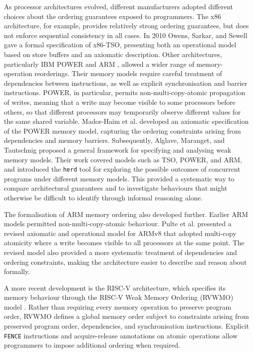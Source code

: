 As processor architectures evolved, different manufacturers adopted different choices about the ordering guarantees exposed to programmers. The x86 architecture, for example, provides relatively strong ordering guarantees, but does not enforce sequential consistency in all cases.  In 2010 Owens, Sarkar, and Sewell \cite{Sewell:2010} gave a formal specification of x86-TSO, presenting both an operational model based on store buffers and an axiomatic description. Other architectures, particularly IBM POWER \cite{powerpc1993} and ARM \cite{furberwilson1987} \cite{alglave2009semantics}, allowed a wider range of memory-operation reorderings. Their memory models require careful treatment of dependencies between instructions, as well as explicit synchronisation and barrier instructions. POWER, in particular, permits non-multi-copy-atomic propagation of writes, meaning that a write may become visible to some processors before others, so that different processors may temporarily observe different values for the same shared variable. Mador-Haim et al. \cite{mador-haim2012} developed an axiomatic specification of the POWER memory model, capturing the ordering constraints arising from dependencies and memory barriers. Subsequently, Alglave, Maranget, and Tautschnig \cite{alglave2014herding} proposed a general framework for specifying and analysing weak memory models. Their work covered models such as TSO, POWER, and ARM, and introduced the \texttt{herd} tool for exploring the possible outcomes of concurrent programs under different memory models. This provided a systematic way to compare architectural guarantees and to investigate behaviours that might otherwise be difficult to identify through informal reasoning alone.

The formalisation of ARM memory ordering also developed further. Earlier ARM models permitted non-multi-copy-atomic behaviour. Pulte et al. \cite{pulte2018armv8} presented a revised axiomatic and operational model for ARMv8 that adopted multi-copy atomicity where a write becomes visible to all processors at the same   point. The revised model also provided a more systematic treatment of dependencies and ordering constraints, making the architecture easier to describe and reason about formally.

A more recent development is the RISC-V architecture, which specifies its memory behaviour through the RISC-V Weak Memory Ordering (RVWMO) model \cite{waterman2019riscv}. Rather than requiring every memory operation to preserve program order, RVWMO defines a global memory order subject to constraints arising from preserved program order, dependencies, and synchronisation instructions. Explicit \texttt{FENCE} instructions and acquire-release annotations on atomic operations allow programmers to impose additional ordering when required. 

